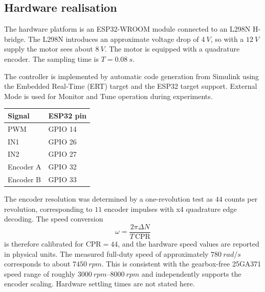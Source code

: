 \subsection{Hardware realisation}

The hardware platform is an ESP32-WROOM module connected to an L298N H-bridge.
The L298N introduces an approximate voltage drop of \(\SI{4}{V}\), so with a
\(\SI{12}{V}\) supply the motor sees about \(\SI{8}{V}\). The motor is equipped
with a quadrature encoder. The sampling time is \(T=\SI{0.08}{s}\).

The controller is implemented by automatic code generation from Simulink using
the Embedded Real-Time (ERT) target and the ESP32 target support. External Mode
is used for Monitor and Tune operation during experiments.

\begin{scripttable}
  \centering
  \caption{ESP32 pin assignment for the DC motor test rig.}
  \label{tab:esp32-pin-assignment}
  \begin{tabular}{ll}
    \toprule
    Signal & ESP32 pin \\
    \midrule
    PWM & GPIO 14 \\
    IN1 & GPIO 26 \\
    IN2 & GPIO 27 \\
    Encoder A & GPIO 32 \\
    Encoder B & GPIO 33 \\
    \bottomrule
  \end{tabular}
\end{scripttable}

The encoder resolution was determined by a one-revolution test as
\(44\) counts per revolution, corresponding to \(11\) encoder impulses with
x4 quadrature edge decoding. The speed conversion
\[
  \omega = \frac{2\pi \Delta N}{T\,\mathrm{CPR}}
\]
is therefore calibrated for \(\mathrm{CPR}=44\), and the hardware speed values
are reported in physical units. The measured full-duty speed of approximately
\(\SI{780}{rad/s}\) corresponds to about \(\SI{7450}{rpm}\). This is consistent
with the gearbox-free 25GA371 speed range of roughly \(\SIrange{3000}{8000}{rpm}\)
and independently supports the encoder scaling. Hardware settling times are
not stated here.
